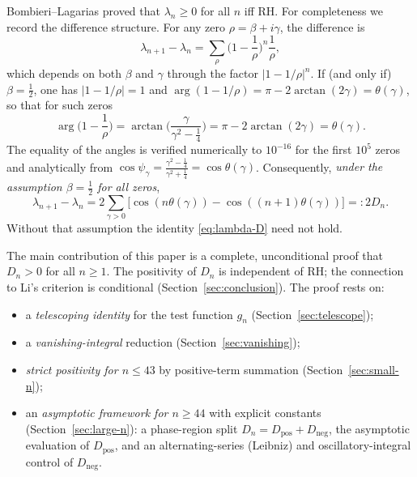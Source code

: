 \documentclass[11pt]{article}
\begin{document}
Bombieri--Lagarias \cite{BL1999} proved that $\lambda_n\ge0$ for all $n$ iff RH.
For completeness we record the difference structure. For any zero
$\rho=\beta+i\gamma$, the difference is
\begin{equation*}
\lambda_{n+1}-\lambda_n=\sum_\rho\Big(1-\frac1\rho\Big)^n\frac1\rho,
\end{equation*}
which depends on both $\beta$ and $\gamma$ through the factor
$|1-1/\rho|^n$. If (and only if) $\beta=\tfrac12$, one has
$|1-1/\rho|=1$ and
$\arg(1-1/\rho)=\pi-2\arctan(2\gamma)=\theta(\gamma)$,
so that for such zeros
\begin{equation}\label{eq:psi-theta}
\arg\Big(1-\frac1\rho\Big)=\arctan\!\Big(\frac{\gamma}{\gamma^2-\tfrac14}\Big)
=\pi-2\arctan(2\gamma)=\theta(\gamma).
\end{equation}
The equality of the angles is verified numerically to $10^{-16}$ for the first
$10^5$ zeros and analytically from
$\cos\psi_\gamma=\frac{\gamma^2-\frac14}{\gamma^2+\frac14}=\cos\theta(\gamma)$.
Consequently, \emph{under the assumption $\beta=\tfrac12$ for all zeros},
\begin{equation}\label{eq:lambda-D}
\lambda_{n+1}-\lambda_n=2\sum_{\gamma>0}\big[\cos(n\theta(\gamma))-\cos((n+1)\theta(\gamma))\big]=:2D_n.
\end{equation}
Without that assumption the identity \eqref{eq:lambda-D} need not hold.

The main contribution of this paper is a complete, unconditional proof that
$D_n>0$ for all $n\ge1$. The positivity of $D_n$ is independent of RH; the
connection to Li's criterion is conditional (Section~\ref{sec:conclusion}). The
proof rests on:

\begin{itemize}
\item a \emph{telescoping identity} for the test function $g_n$ (Section~\ref{sec:telescope});
\item a \emph{vanishing-integral} reduction (Section~\ref{sec:vanishing});
\item \emph{strict positivity for $n\le43$} by positive-term summation (Section~\ref{sec:small-n});
\item an \emph{asymptotic framework for $n\ge44$} with explicit constants
(Section~\ref{sec:large-n}): a phase-region split $D_n=D_{\mathrm{pos}}+D_{\mathrm{neg}}$,
the asymptotic evaluation of $D_{\mathrm{pos}}$, and an alternating-series (Leibniz) and
oscillatory-integral control of $D_{\mathrm{neg}}$.
\end{itemize}
\end{document}
